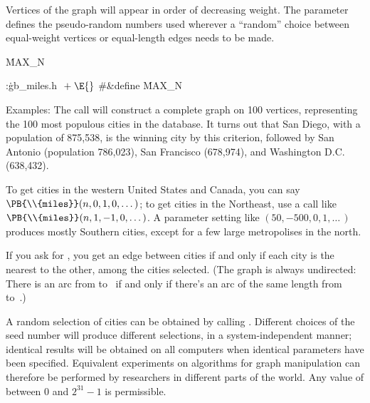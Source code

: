 Vertices of the graph will appear in order of decreasing weight.
The  parameter defines the pseudo-random numbers used wherever
a ``random'' choice between equal-weight vertices or equal-length edges
needs to be made.

\Y\B\4\D\.{MAX\_N}\5
\par
\Y\B\4:\.{gb\_miles.h }\X${}\mathrel+\E{}$\6
\8\#\&{define} \.{MAX\_N}\5\par
\fi

Examples: The call  will construct a
complete graph on 100 vertices, representing the 100 most populous
cities in the database.  It turns out that San Diego, with a
population of 875,538, is the winning city by this criterion, followed
by San Antonio (population 786,023), San Francisco (678,974), and
Washington D.C. (638,432).

To get  cities in the western United States and Canada, you can say
$\PB{\\{miles}}(n,0,1,0,\ldots\,)$; to get  cities in the Northeast,
use a
call like $\PB{\\{miles}}(n,1,-1,0,\ldots\,)$. A parameter setting like
$(50,-500,0,1,\ldots\,)$ produces mostly Southern cities, except for a
few large metropolises in the north.

If you ask for , you get an
edge between cities if
and only if each city is the nearest to the other, among the  cities
selected. (The graph is always undirected: There is an arc from  to~%
if and only if there's an arc of the same length from  to~.)

A random selection of cities can be obtained by calling
.  Different choices of the
seed number  will
produce different selections, in a system-independent manner;
identical results will be obtained on all computers when identical
parameters have been specified.  Equivalent experiments on algorithms
for graph manipulation can therefore be performed by researchers in
different parts of the world. Any value of  between 0 and
$2^{31}-1$ is permissible.

\fi

